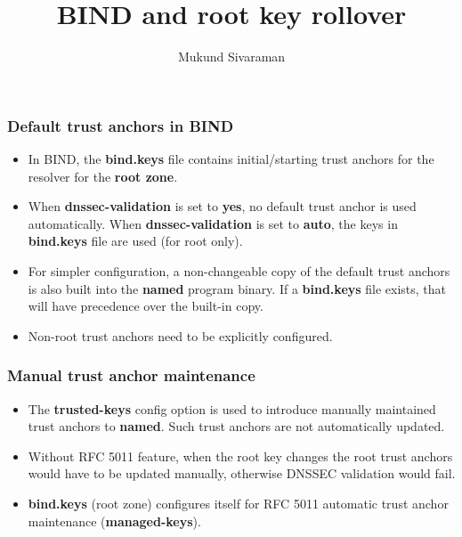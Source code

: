 \documentclass{beamer}
\title{BIND and root key rollover}
\author{Mukund Sivaraman}
\institute{Internet Systems Consortium}
\date{}
\begin{document}
\frame{\titlepage}

\frame
{
  \frametitle{Default trust anchors in BIND}

  \begin{itemize}

  \item In BIND, the \textbf{bind.keys} file contains initial/starting
    trust anchors for the resolver for the \textbf{root zone}.

  \item When \textbf{dnssec-validation} is set to \textbf{yes}, no
    default trust anchor is used automatically. When
    \textbf{dnssec-validation} is set to \textbf{auto}, the keys in
    \textbf{bind.keys} file are used (for root only).

  \item For simpler configuration, a non-changeable copy of the default
    trust anchors is also built into the \textbf{named} program
    binary. If a \textbf{bind.keys} file exists, that will have
    precedence over the built-in copy.

  \item Non-root trust anchors need to be explicitly configured.

  \end{itemize}
}

\frame
{
  \frametitle{Manual trust anchor maintenance}

  \begin{itemize}
  \item The \textbf{trusted-keys} config option is used to introduce
    manually maintained trust anchors to \textbf{named}. Such trust
    anchors are not automatically updated.

  \item Without RFC 5011 feature, when the root key changes the root
    trust anchors would have to be updated manually, otherwise DNSSEC
    validation would fail.

  \item \textbf{bind.keys} (root zone) configures itself for RFC 5011
    automatic trust anchor maintenance (\textbf{managed-keys}).

  \end{itemize}
}
\end{document}
